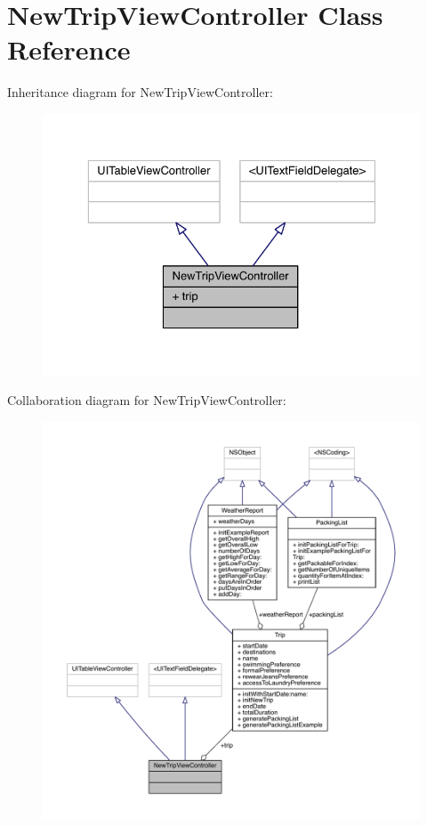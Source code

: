 \hypertarget{interface_new_trip_view_controller}{\section{New\-Trip\-View\-Controller Class Reference}
\label{interface_new_trip_view_controller}
}


Inheritance diagram for New\-Trip\-View\-Controller\-:\nopagebreak
\begin{figure}[H]
\begin{center}
\leavevmode
\includegraphics[width=329pt]{interface_new_trip_view_controller__inherit__graph}
\end{center}
\end{figure}


Collaboration diagram for New\-Trip\-View\-Controller\-:\nopagebreak
\begin{figure}[H]
\begin{center}
\leavevmode
\includegraphics[width=350pt]{interface_new_trip_view_controller__coll__graph}
\end{center}
\end{figure}
